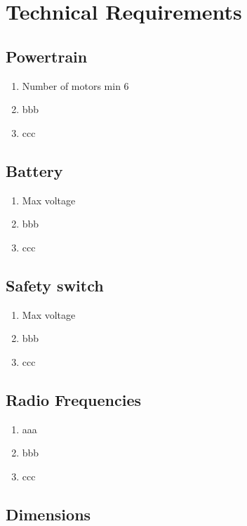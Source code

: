 
\chapter{Technical Requirements}\label{chapter:Technical}

\section{Powertrain}
\begin{enumerate}
    \item Number of motors min 6
    \item bbb
    \item ccc
  \end{enumerate}

  \section{Battery}
  \begin{enumerate}
      \item Max voltage
      \item bbb
      \item ccc
    \end{enumerate}

    \section{Safety switch}
  \begin{enumerate}
      \item Max voltage
      \item bbb
      \item ccc
    \end{enumerate}


\section{Radio Frequencies}
    \begin{enumerate}
        \item aaa
        \item bbb
        \item ccc
      \end{enumerate}
  

\section{Dimensions}


